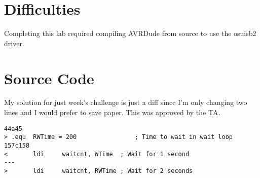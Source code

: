 \documentclass[12pt,letterpaper]{article}
\begin{document}
\section{Difficulties}
Completing this lab required compiling AVRDude from source to use the osuisb2
driver.

\section{Source Code}
My solution for just week's challenge is just a diff since I'm only changing
two lines and I would prefer to save paper. This was approved by the TA.
\begin{verbatim}
44a45
> .equ  RWTime = 200                ; Time to wait in wait loop
157c158
<       ldi     waitcnt, WTime  ; Wait for 1 second
---
>       ldi     waitcnt, RWTime ; Wait for 2 seconds

\end{verbatim}
\end{document}
